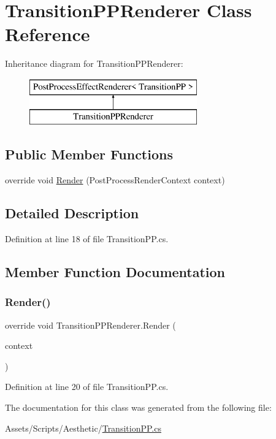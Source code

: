 \hypertarget{class_transition_p_p_renderer}{}\section{Transition\+P\+P\+Renderer Class Reference}
\label{class_transition_p_p_renderer}
Inheritance diagram for Transition\+P\+P\+Renderer\+:\begin{figure}[H]
\begin{center}
\leavevmode
\includegraphics[height=2.000000cm]{class_transition_p_p_renderer}
\end{center}
\end{figure}
\subsection*{Public Member Functions}
\begin{DoxyCompactItemize}
\item 
override void \mbox{\hyperlink{class_transition_p_p_renderer_aaafe95b5ab96906ff7159a80bed82a39}{Render}} (Post\+Process\+Render\+Context context)
\end{DoxyCompactItemize}


\subsection{Detailed Description}


Definition at line 18 of file Transition\+P\+P.\+cs.



\subsection{Member Function Documentation}
\mbox{\label{class_transition_p_p_renderer_aaafe95b5ab96906ff7159a80bed82a39}} 
\subsubsection{\texorpdfstring{Render()}{Render()}}
{\footnotesize\ttfamily override void Transition\+P\+P\+Renderer.\+Render (\begin{DoxyParamCaption}\item[{Post\+Process\+Render\+Context}]{context }\end{DoxyParamCaption})}



Definition at line 20 of file Transition\+P\+P.\+cs.



The documentation for this class was generated from the following file\+:\begin{DoxyCompactItemize}
\item 
Assets/\+Scripts/\+Aesthetic/\mbox{\hyperlink{_transition_p_p_8cs}{Transition\+P\+P.\+cs}}\end{DoxyCompactItemize}
